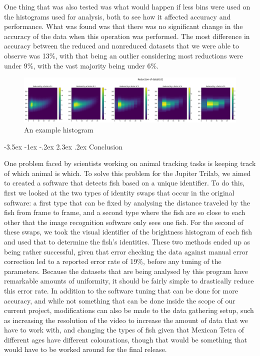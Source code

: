 \documentclass{article}
\makeatletter
\renewcommand\section{\clearpage\newpage\@startsection {section}{1}{\z@}%
	{-3.5ex \@plus -1ex \@minus -.2ex}%
	{2.3ex \@plus.2ex}%
	{\normalfont\Large\bfseries}}
\makeatother
\begin{document}
One thing that was also tested was what would happen if less bins were used on the histograms used for analysis, both to see how it affected accuracy and performance. What was found was that there was no significant change in the accuracy of the data when this operation was performed. The most difference in accuracy between the reduced and nonreduced datasets that we were able to observe was 13\%, with that being an outlier considering most reductions were under 9\%, with the vast majority being under 6\%. 

\begin{figure}[H]
	\centering
	\includegraphics[width=\linewidth]{reducedHist}
	\caption{An example histogram}
	\label{fig:reducedHist}
\end{figure}

\section{Conclusion}

One problem faced by scientists working on animal tracking tasks is keeping track of which animal is which. To solve this problem for the Jupiter Trilab, we aimed to created a software that detects fish based on a unique identifier. To do this, first we looked at the two types of identity swaps that occur in the original software: a first type that can be fixed by analysing the distance traveled by the fish from frame to frame, and a second type where the fish are so close to each other that the image recognition software only sees one fish. For the second of these swaps, we took the visual identifier of the brightness histogram of each fish and used that to determine the fish's identities. These two methods ended up as being rather successful, given that error checking the data against manual error correction led to a reported error rate of 19\%, before any tuning of the parameters. Because the datasets that are being analysed by this program have remarkable amounts of uniformity, it should be fairly simple to drastically reduce this error rate. In addition to the software tuning that can be done for more accuracy, and while not something that can be done inside the scope of our current project, modifications can also be made to the data gathering setup, such as increasing the resolution of the video to increase the amount of data that we have to work with, and changing the types of fish given that Mexican Tetra of different ages have different colourations, though that would be something that would have to be worked around for the final release.
\end{document}
